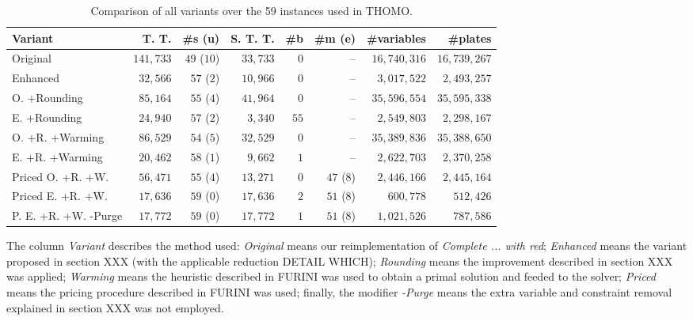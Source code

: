 \documentclass[smallextended]{svjour3}       %
\begin{document}
\begin{table}
\caption{Comparison of all variants over the 59 instances used in THOMO.}
\begin{tabular}{lrrrrrrr}
\hline\hline
\textbf{Variant} & \textbf{T. T.} & \textbf{\#s (u)} & \textbf{S. T. T.} & \textbf{\#b} & \textbf{\#m (e)} & \textbf{\#variables} & \textbf{\#plates} \\\hline
Original & \(141,733\) & \(49\) (\(10\)) & \(33,733\) & \(0\) & -- & \(16,740,316\) & \(16,739,267\) \\
Enhanced & \(32,566\) & \(57\) (\(2\)) & \(10,966\) & \(0\) & -- & \(3,017,522\) & \(2,493,257\) \\
O. +Rounding & \(85,164\) & \(55\) (\(4\)) & \(41,964\) & \(0\) & -- & \(35,596,554\) & \(35,595,338\) \\
E. +Rounding & \(24,940\) & \(57\) (\(2\)) & \(3,340\) & \(55\) & -- & \(2,549,803\) & \(2,298,167\) \\
O. +R. +Warming & \(86,529\) & \(54\) (\(5\)) & \(32,529\) & \(0\) & -- & \(35,389,836\) & \(35,388,650\) \\
E. +R. +Warming & \(20,462\) & \(58\) (\(1\)) & \(9,662\) & \(1\) & -- & \(2,622,703\) & \(2,370,258\) \\
Priced O. +R. +W. & \(56,471\) & \(55\) (\(4\)) & \(13,271\) & \(0\) & \(47\) (\(8\)) & \(2,446,166\) & \(2,445,164\) \\
Priced E. +R. +W. & \(17,636\) & \(59\) (\(0\)) & \(17,636\) & \(2\) & \(51\) (\(8\)) & \(600,778\) & \(512,426\) \\
P. E. +R. +W. -Purge & \(17,772\) & \(59\) (\(0\)) & \(17,772\) & \(1\) & \(51\) (\(8\)) & \(1,021,526\) & \(787,586\) \\\hline\hline
\end{tabular}
\label{tab:contribution}
\end{table}

The column \emph{Variant} describes the method used: \emph{Original} means our reimplementation of \emph{Complete ... with red}; \emph{Enhanced} means the variant proposed in section XXX (with the applicable reduction DETAIL WHICH); \emph{Rounding} means the improvement described in section XXX was applied; \emph{Warming} means the heuristic described in FURINI was used to obtain a primal solution and feeded to the solver; \emph{Priced} means the pricing procedure described in FURINI was used; finally, the modifier \emph{-Purge} means the extra variable and constraint removal explained in section XXX was not employed.
\end{document}
